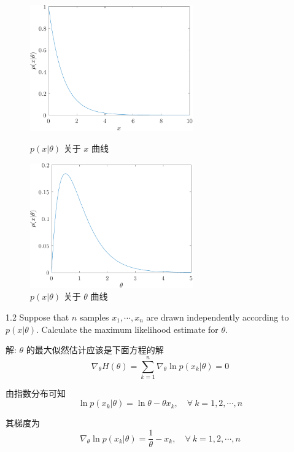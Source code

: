 \documentclass[openany]{ctexbook}
\theoremstyle{kaiti}
\theoremstyle{normal}
\begin{document}
\begin{figure}[htbp]
  \centering
  \begin{minipage}[t]{0.48\textwidth}
  \centering
  \includegraphics[width=7cm]{epdf-1.pdf}
  \caption{$p(x|\theta)$ 关于 $x$ 曲线}
  \label{fig:epdf1}
  \end{minipage}
  \begin{minipage}[t]{0.48\textwidth}
  \centering
  \includegraphics[width=7cm]{epdf-2.pdf}
  \caption{$p(x|\theta)$ 关于 $\theta$ 曲线}
  \label{fig:epdf2}
  \end{minipage}
\end{figure}

1.2 Suppose that $n$ samples ${x_1, \cdots, x_n}$ are drawn independently according to $p(x|\theta)$.
Calculate the maximum likelihood estimate for $\theta$.

解: $\theta$ 的最大似然估计应该是下面方程的解
\begin{equation}
  \nabla_\theta H(\theta)=\sum_{k=1}^n\nabla_\theta\ln p(x_k|\theta)=0
\end{equation}

由指数分布可知
\begin{equation}
  \ln p(x_k|\theta)=\ln\theta-\theta x_k,\quad\forall~k=1,2,\cdots,n
\end{equation}

其梯度为
\begin{equation}
  \nabla_\theta\ln p(x_k|\theta)=\frac{1}{\theta}-x_k,\quad\forall~k=1,2,\cdots,n
\end{equation}
\end{document}
